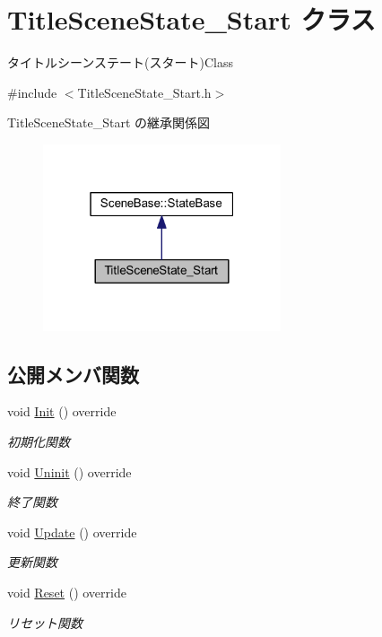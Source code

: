 \hypertarget{class_title_scene_state___start}{}\section{Title\+Scene\+State\+\_\+\+Start クラス}
\label{class_title_scene_state___start}


タイトルシーンステート(スタート)Class  




{\ttfamily \#include $<$Title\+Scene\+State\+\_\+\+Start.\+h$>$}



Title\+Scene\+State\+\_\+\+Start の継承関係図\nopagebreak
\begin{figure}[H]
\begin{center}
\leavevmode
\includegraphics[width=199pt]{class_title_scene_state___start__inherit__graph}
\end{center}
\end{figure}
\subsection*{公開メンバ関数}
\begin{DoxyCompactItemize}
\item 
void \mbox{\hyperlink{class_title_scene_state___start_a3e785ba088ac3fd0989fd657e5d0cd34}{Init}} () override
\begin{DoxyCompactList}\small\item\em 初期化関数 \end{DoxyCompactList}\item 
void \mbox{\hyperlink{class_title_scene_state___start_a5bcb4d7a9250ea1c0041c38616ffabfe}{Uninit}} () override
\begin{DoxyCompactList}\small\item\em 終了関数 \end{DoxyCompactList}\item 
void \mbox{\hyperlink{class_title_scene_state___start_a2e98cf6810711b58766d7147168d02eb}{Update}} () override
\begin{DoxyCompactList}\small\item\em 更新関数 \end{DoxyCompactList}\item 
void \mbox{\hyperlink{class_title_scene_state___start_af4dfe902a4391ca8f0cff5d1aa9507f8}{Reset}} () override
\begin{DoxyCompactList}\small\item\em リセット関数 \end{DoxyCompactList}\end{DoxyCompactItemize}
